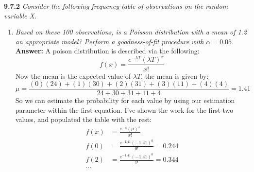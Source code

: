 \documentclass[11pt]{article}
\begin{document}
\noindent \textbf{9.7.2} \emph{Consider the following frequency table of observations on the random variable X.}
\begin{enumerate}
\item \emph{Based on these 100 observations, is a Poisson distribution with a mean of 1.2 an appropriate model? Perform a goodness-of-fit procedure with $\alpha = 0.05$.}
\\\textbf{Answer:} A poison distribution is described via the following:
\begin{equation}
f(x) = \frac{e^{-\lambda T}(\lambda T)^x}{x!}
\end{equation}
Now the mean is the expected value of $\lambda T$, the mean is given by:
\begin{equation}
\mu = \frac{(0)(24) + (1)(30)+ (2)(31) + (3)(11) + (4)(4)}{24 + 30 + 31 + 11 + 4} = 1.41
\end{equation}
So we can estimate the probability for each value by using our estimation parameter within the first equation. I've shown the work for the first two values, and populated the table with the rest:
\begin{equation}
\begin{split}
f(x) &= \frac{e^{-\mu}(\mu)^x}{x!}\\
f(0) &= \frac{e^{-1.41}(-1.41)^0}{0!} = 0.244 \\
f(2) &= \frac{e^{-1.41}(-1.41)^0}{1!} = 0.344 \\
...&
\end{split}
\end{equation}



\end{enumerate}
\end{document}
